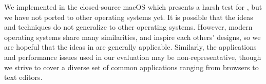 We implemented \xxx in the closed-source macOS which presents a harsh test
for \xxx, but we have not ported \xxx to other operating systems yet. It is
possible that the ideas and techniques do not generalize to other operating
systems. However, modern operating systems share many similarities, and inspire
each others' designs, so we are hopeful that the ideas in \xxx are generally
applicable. Similarly, the applications and performance issues used in our
evaluation may be non-representative, though we strive to cover a diverse set of
common applications ranging from browsers to text editors.
